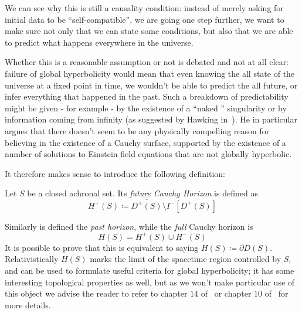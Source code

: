 We can see why this is still a causality condition: instead of merely asking for initial data to be ``self-compatible'', we are going one step further, we want to make sure not only that we can state some conditions, but also that we are able to predict what happens everywhere in the universe. 

Whether this is a reasonable assumption or not is debated and not at all clear: failure of global hyperbolicity would mean that even knowing the all state of the universe at a fixed point in time, we wouldn't be able to predict the all future, or infer everything that happened in the past. Such a breakdown of predictability might be given - for example - by the existence of a ``naked '' singularity or by information coming from infinity (as suggested by Hawking in~\cite{hawking1973large}). He in particular argues that there doesn't seem to be any physically compelling reason for believing in the existence of a Cauchy surface, supported by the existence of a number of solutions to Einstein field equations that are not globally hyperbolic.

\noindent It therefore makes sense to introduce the following definition:
\begin{definition}
	Let \(S\) be a closed achronal set. Its \emph{future Cauchy Horizon} is defined as 
	\[
	H^+(S) \coloneqq \overline{D^+(S)} \setminus I^-[D^+(S)]	
	\]
\end{definition}
	Similarly is defined the \emph{past horizon}, while the \emph{full} Cauchy horizon is
	\[
	H(S) = 	H^+(S) \cup H^-(S)
	\]
	It is possible to prove that this is equivalent to saying \(H(S) \coloneqq \partial D(S)\). Relativistically \(H(S)\) marks the limit of the spacetime region controlled by \(S\), and can be used to formulate useful criteria for global hyperbolicity; it has some interesting topological properties as well, but as we won't make particular use of this object we advise the reader to refer to chapter \(14\) of~\cite{o1983semi} or chapter \(10\) of~\cite{wald2010general} for more details.